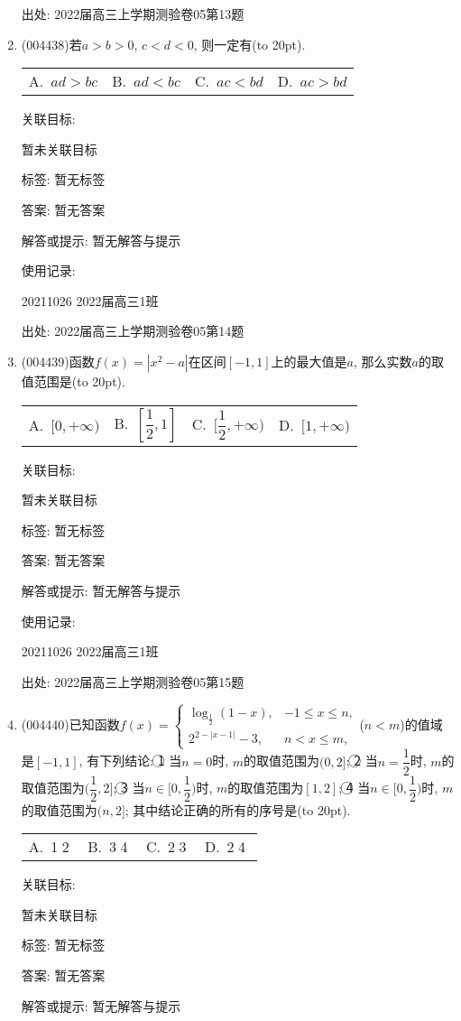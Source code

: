 \documentclass[10pt,a4paper]{article}
\newcommand{\bracket}[1]{(\hbox to #1pt{})}
\newcommand{\fourch}[4]{\par\begin{tabular}{p{.23\textwidth}p{.23\textwidth}p{.23\textwidth}p{.23\textwidth}}
A.~#1 &B.~#2& C.~#3& D.~#4
\end{tabular}}
\begin{document}
\begin{enumerate}[1.]
出处: 2022届高三上学期测验卷05第13题
\item { (004438)}若$a>b>0$, $c<d<0$, 则一定有\bracket{20}.
\fourch{$ad>bc$}{$ad<bc$}{$ac<bd$}{$ac>bd$}


关联目标:

暂未关联目标



标签: 暂无标签

答案: 暂无答案

解答或提示: 暂无解答与提示

使用记录:

20211026	2022届高三1班	


出处: 2022届高三上学期测验卷05第14题
\item { (004439)}函数$f(x)=|x^2-a|$在区间$[-1,1]$上的最大值是$a$, 那么实数$a$的取值范围是\bracket{20}.
\fourch{$[0,+\infty)$}{$[\dfrac 12,1]$}{$[\dfrac 12,+\infty)$}{$[1,+\infty)$}


关联目标:

暂未关联目标



标签: 暂无标签

答案: 暂无答案

解答或提示: 暂无解答与提示

使用记录:

20211026	2022届高三1班	


出处: 2022届高三上学期测验卷05第15题
\item { (004440)}已知函数$f(x)=\begin{cases}\log_{\frac 12}(1-x), & -1\le x\le n,  \\ 2^{2-|x-1|}-3, & n<x\le m,  \end{cases}$($n<m$)的值域是$[-1,1]$, 有下列结论:
\textcircled{1} 当$n=0$时, $m$的取值范围为$(0,2]$; \textcircled{2}  当$n=\dfrac 12$时, $m$的取值范围为$(\dfrac 12,2]$; \textcircled{3}  当$n\in [0,\dfrac 12)$时, $m$的取值范围为$[1,2]$; \textcircled{4}  当$n\in [0,\dfrac 12)$时, $m$的取值范围为$(n,2]$;
其中结论正确的所有的序号是\bracket{20}.
\fourch{\textcircled{1}\textcircled{2}}{\textcircled{3}\textcircled{4}}{\textcircled{2}\textcircled{3}}{\textcircled{2}\textcircled{4}}


关联目标:

暂未关联目标



标签: 暂无标签

答案: 暂无答案

解答或提示: 暂无解答与提示


\end{enumerate}
\end{document}
